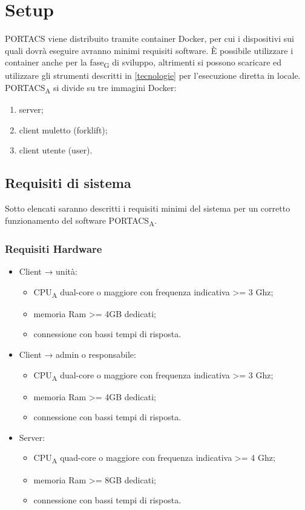 \section{Setup}
PORTACS viene distribuito tramite container Docker, per cui i dispositivi sui quali dovrà eseguire avranno minimi requisiti software. È possibile utilizzare i container anche per la fase\textsubscript{G} di sviluppo, altrimenti si possono scaricare ed utilizzare gli strumenti descritti in \ref{tecnologie} per l'esecuzione diretta in locale. PORTACS\textsubscript{A} si divide su tre immagini Docker:
\begin{enumerate}
    \item server;
    \item client muletto (forklift);
    \item client utente (user).
\end{enumerate}


\subsection{Requisiti di sistema}
Sotto elencati saranno descritti i requisiti minimi del sistema per un corretto funzionamento del software PORTACS\textsubscript{A}.


\subsubsection{Requisiti Hardware}
\begin{itemize}
	\item Client → unità:
\begin{itemize}
	\item CPU\textsubscript{A} dual-core o maggiore con frequenza indicativa >= 3 Ghz;
	\item memoria Ram >= 4GB dedicati;
	\item connessione con bassi tempi di risposta.
\end{itemize}
	\item Client → admin o responsabile:
\begin{itemize}
	\item CPU\textsubscript{A} dual-core o maggiore con frequenza indicativa >= 3 Ghz;
	\item memoria Ram >= 4GB dedicati;
	\item connessione con bassi tempi di risposta.
\end{itemize}
	\item Server:
\begin{itemize}
	\item CPU\textsubscript{A} quad-core o maggiore con frequenza indicativa >= 4 Ghz;
	\item memoria Ram >= 8GB dedicati;
	\item connessione con bassi tempi di risposta.
\end{itemize}
\end{itemize}

